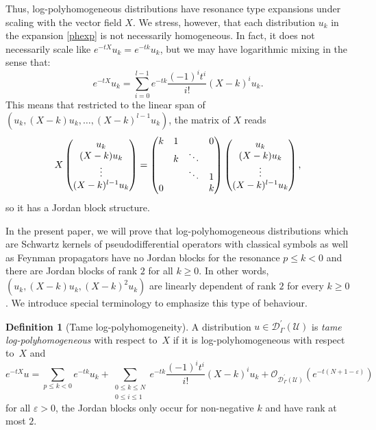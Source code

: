 \documentclass[JEP,XML,SOM,Unicode]{cedram}
\let\pazocal\mathscr
\theoremstyle{definition}
\newtheorem{definition}[theorem]{Definition}
\let\euler X
\begin{document}
Thus, log-polyhomogeneous distributions have resonance type expansions under scaling with the vector field $\euler$.
We stress, however, that each distribution $u_k$ in the expansion \eqref{phexp} is not necessarily homogeneous.
In fact, it does
not necessarily scale like $e^{-t\euler}u_k=e^{-tk}u_k$, but we may have
logarithmic mixing in the sense that:
\[
e^{-t\euler}u_k=\sum_{i=0}^{l-1} e^{-tk} \frac{(-1)^i t^i}{i!}\left(\euler-k\right)^i u_k.
\]
This means that restricted to the linear span of $(u_k,(\euler-k) u_k,\dots,(\euler-k)^{l-1}u_k)$, the matrix of $\euler$
reads
\[\arraycolsep5pt
\euler\begin{pmatrix}
u_k\\
(\euler-k) u_k\\
\vdots \\
(\euler-k)^{l-1}u_k
\end{pmatrix}=
\begin{pmatrix}
k&1& &0\\
&k& \ddots &\\
& &\ddots &1 \\
0 & & &k
\end{pmatrix}
\begin{pmatrix}
u_k\\
(\euler-k) u_k\\
\vdots \\
(\euler-k)^{l-1}u_k
\end{pmatrix},
\]
so it has a Jordan block structure.

In the present paper, we will prove that log-polyhomogeneous distributions which are
Schwartz kernels of pseudodifferential operators with classical symbols as well as Feynman propagators have no Jordan blocks for the resonance $p\leqslant k<0$ and there are Jordan blocks of rank $2$ for all $k\geqslant 0$. In other words,
$(u_k,(\euler-k) u_k, (\euler-k)^2u_k) $ are linearly dependent of rank $2$ for every $k\geqslant 0$.
We introduce special terminology to emphasize this type of behaviour.

\begin{definition}[Tame log-polyhomogeneity]
A distribution $u\in \pazocal{D}^\prime_\Gamma(\pazocal{U})$ is \emph{tame log-polyhomogeneous} with respect to~$\euler$
if it is log-polyhomogeneous with respect to~$\euler$ and
\[
e^{-t\euler}u=\sum_{p\leqslant k<0} e^{-tk} u_k + \sum_{\substack{0\leqslant k\leqslant N\\0\leqslant i\leqslant 1}} e^{-tk} \frac{(-1)^i t^i}{i!}\left(\euler-k\right)^i u_k +\pazocal{O}_{\pazocal{D}^\prime_\Gamma(\pazocal{U})}(e^{-t(N+1-\varepsilon)})
\]
for all $\varepsilon>0$, \ie the Jordan blocks only occur for non-negative $k$ and have rank at most $2$.
\end{definition}
\end{document}
